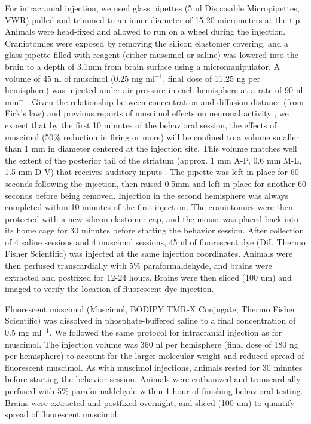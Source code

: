 For intracranial injection, we used glass pipettes (5 ul Disposable Micropipettes, VWR) pulled and trimmed to an inner diameter of 15-20 micrometers at the tip. Animals were head-fixed and allowed to run on a wheel during the injection. Craniotomies were exposed by removing the silicon elastomer covering, and a glass pipette filled with reagent (either muscimol or saline) was lowered into the brain to a depth of 3.1mm from brain surface using a micromanipulator. A volume of 45 nl of muscimol (0.25 mg ml$^{-1}$, final dose of 11.25 ng per hemisphere) was injected under air pressure in each hemisphere at a rate of 90 nl min$^{-1}$.
%
Given the relationship between concentration and diffusion distance (from Fick's law) and previous reports of muscimol effects on neuronal activity \citep{Edeline2002}, we expect that by the first 10 minutes of the behavioral session, the effects of muscimol (50\% reduction in firing or more) will be confined to a volume smaller than 1 mm in diameter centered at the injection site. This volume matches well the extent of the posterior tail of the striatum (approx. 1 mm A-P, 0.6 mm M-L, 1.5 mm D-V) that receives auditory inputs \citep{Hunnicutt2016}.
%
The pipette was left in place for 60 seconds following the injection, then raised 0.5mm and left in place for another 60 seconds before being removed. Injection in the second hemisphere was always completed within 10 minutes of the first injection. The craniotomies were then protected with a new silicon elastomer cap, and the mouse was placed back into its home cage for 30 minutes before starting the behavior session. After collection of 4 saline sessions and 4 muscimol sessions, 45 nl of fluorescent dye (DiI, Thermo Fisher Scientific) was injected at the same injection coordinates. Animals were then perfused transcardially with 5\% paraformaldehyde, and brains were extracted and postfixed for 12-24 hours. Brains were then sliced (100 um) and imaged to verify the location of fluorescent dye injection.

Fluorescent muscimol (Muscimol, BODIPY TMR-X Conjugate, Thermo Fisher Scientific) was dissolved in phosphate-buffered saline to a final concentration of 0.5 mg ml$^{-1}$. We followed the same protocol for intracranial injection as for muscimol. The injection volume was 360 nl per hemisphere (final dose of 180 ng per hemisphere) to account for the larger molecular weight and reduced spread of fluorescent muscimol. As with muscimol injections, animals rested for 30 minutes before starting the behavior session. Animals were euthanized and transcardially perfused with 5\% paraformaldehyde within 1 hour of finishing behavioral testing. Brains were extracted and postfixed overnight, and sliced (100 um) to quantify spread of fluorescent muscimol.

